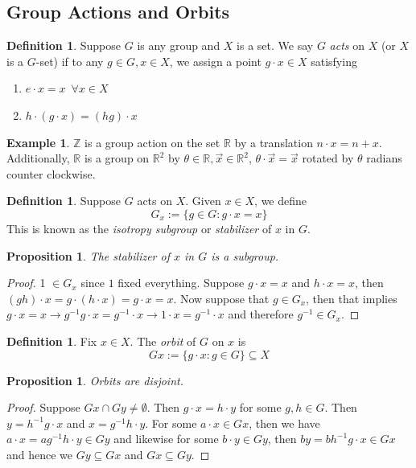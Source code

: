 \documentclass{article}
\newcommand{\R}{\mathbb{R}}
\newcommand{\Z}{\mathbb{Z}}
\newtheorem{proposition}[theorem]{Proposition}
\theoremstyle{definition}
\newtheorem{definition}[theorem]{Definition}
\newtheorem{example}[theorem]{Example}
\begin{document}
\subsection{Group Actions and Orbits}
\begin{definition}
    Suppose $G$ is any group and $X$ is a set. We say $G$ \emph{acts} on $X$ (or $X$ is a $G$-set) if to any $g\in G, x\in X$, we assign a point $g\cdot x \in X$ satisfying 
    \begin{enumerate}
        \item $e\cdot x=x\,\,\, \forall x\in X$
        \item $h\cdot (g\cdot x) = (hg)\cdot x$
    \end{enumerate}
\end{definition}
\begin{example}
    $\Z$ is a group action on the set $\R$ by a translation $n\cdot x=n+x$. Additionally, $\R$ is a group on $\R^2$ by $\theta \in \R, \vec{x}\in \R^2$, $\theta \cdot \vec{x} = \vec{x}$ rotated by $\theta$ radians counter clockwise. 
\end{example}
\begin{definition}
    Suppose $G$ acts on $X$. Given $x\in X$, we define 
    \begin{equation*}
        G_x := \{ g\in G: g\cdot x = x\}
    \end{equation*}
    This is known as the \emph{isotropy subgroup} or \emph{stabilizer} of $x$ in $G$.
\end{definition}
\begin{proposition}
    The stabilizer of $x$ in $G$ is a subgroup.
\end{proposition} 
\begin{proof}
    1 $\in G_x$ since $1$ fixed everything. Suppose $g\cdot x=x $ and $h\cdot x=x$, then $(gh)\cdot x = g\cdot (h\cdot x) = g\cdot x=x$. Now suppose that $g\in G_x$, then that implies $g\cdot x= x \to g^{-1}g\cdot x=g^{-1}\cdot x\to 1\cdot x=g^{-1}\cdot x$ and therefore $g^{-1} \in G_x$.
\end{proof}
\begin{definition}
    Fix $x\in X$. The \emph{orbit} of $G$ on $x$ is 
    \begin{equation*}
        Gx := \{ g\cdot x: g\in G\} \subseteq X
    \end{equation*}
\end{definition}
\begin{proposition}
    Orbits are disjoint.
\end{proposition}
\begin{proof}
    Suppose $Gx\cap Gy \neq \emptyset$. Then $g\cdot x = h\cdot y$ for some $g,h \in G$. Then $y = h^{-1}g\cdot x$ and $x=g^{-1}h\cdot y$. For some $a\cdot x \in Gx$, then we have $a\cdot x=ag^{-1}h\cdot y \in Gy$ and likewise for some $b\cdot y \in Gy$, then $by = bh^{-1}g\cdot x \in Gx$ and hence we $Gy\subseteq Gx$ and $Gx \subseteq Gy$.
\end{proof}
\end{document}
